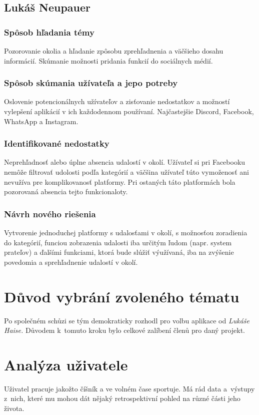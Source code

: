 \documentclass[12pt, titlepage]{article}
\begin{document}
\subsection{Lukáš Neupauer}
\subsubsection{Spôsob hľadania témy}
Pozorovanie okolia a hľadanie zpôsobu zprehľadnenia a väčšieho dosahu informácií. Skúmanie možnosti pridania funkcií do sociálnych médií.

\subsubsection{Spôsob skúmania užívateľa a jepo potreby}
Oslovenie potencionálnych užívateľov a zisťovanie nedostatkov a možností vylepšení aplikácií v ich každodennom používaní. Najčastejšie Discord, Facebook, WhatsApp a Instagram. 

\subsubsection{Identifikované nedostatky}
Neprehľadnosť alebo úplne absencia udalostí v okolí. Užívateľ si pri Facebooku nemôže filtrovať udolosti podľa kategórií a väčšina užívateľ túto vymoženosť ani nevužíva pre komplikovanosť platformy. Pri ostaných táto platformách bola pozorovaná absencia tejto funkcionaloty. 

\subsubsection{Návrh nového riešenia}
Vytvorenie jednoduchej platformy s udalosťami v okolí, s možnosťou zoradienia do kategórií, funciou zobrazenia udalosti iba určitým ľudom (napr. system prateľov) a ďalšími funkciami, ktorá bude slúžiť výužívaná, iba na zvýšenie povedomia a sprehľadnenie udalostí v okolí. 



\newpage



\section{Důvod vybrání zvoleného tématu}
Po společném schůzi se tým demokraticky rozhodl pro volbu aplikace od \emph{Lukáše Haise.} Důvodem k~tomuto kroku bylo celkové zalíbení členů pro daný projekt.

\section{Analýza uživatele}
Uživatel pracuje jakožto číšník a ve volném čase sportuje. Má rád data a~výstupy z~nich, které mu mohou dát nějaký retrospektivní pohled na různé části jeho života. 
\end{document}
